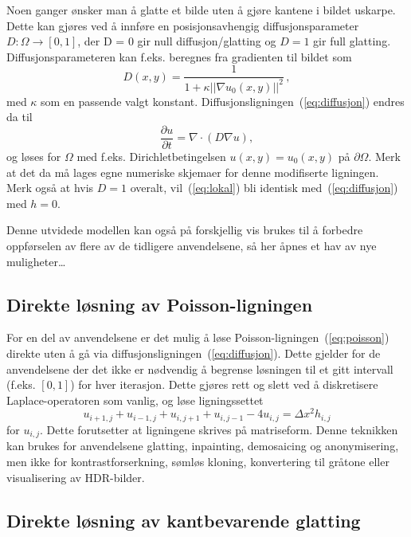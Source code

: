 \documentclass[11pt,a4paper]{article}
\begin{document}
Noen ganger ønsker man å glatte et bilde uten å gjøre kantene i bildet uskarpe. Dette kan gjøres ved å innføre en posisjonsavhengig diffusjonsparameter $D : \Omega \to [0, 1]$, der D = 0 gir null diffusjon/glatting og $D = 1$ gir full glatting. Diffusjonsparameteren kan f.eks. beregnes fra gradienten til bildet som
\begin{equation}
  D(x, y) = \frac{1}{1 + \kappa ||\nabla u_0(x, y)||^2}\,,
  \label{eq:diffparam}
\end{equation}
med $\kappa$ som en passende valgt konstant.
Diffusjonsligningen~(\ref{eq:diffusjon}) endres da til
\begin{equation}
  \label{eq:lokal}
  \frac{\partial u}{\partial t} = \nabla\cdot(D\nabla u),
\end{equation}
og løses for $\Omega$ med f.eks. Dirichletbetingelsen $u(x, y) = u_0(x, y)$ på $\partial\Omega$. Merk at det da må lages egne numeriske skjemaer for denne modifiserte ligningen. Merk også at hvis $D=1$ overalt, vil~(\ref{eq:lokal}) bli identisk med~(\ref{eq:diffusjon}) med $h=0$.

Denne utvidede modellen kan også på forskjellig vis brukes til å forbedre oppførselen av flere av de tidligere anvendelsene, så her åpnes et hav av nye muligheter\dots

\subsection{Direkte løsning av Poisson-ligningen}
\label{sec:poisson}

For en del av anvendelsene er det mulig å løse Poisson-ligningen~(\ref{eq:poisson}) direkte uten å gå via diffusjonsligningen~(\ref{eq:diffusjon}). Dette gjelder for de anvendelsene der det ikke er nødvendig å begrense løsningen til et gitt intervall (f.eks. $[0, 1]$) for hver iterasjon. Dette gjøres rett og slett ved å diskretisere Laplace-operatoren som vanlig, og løse ligningssettet
$$
u_{i+1,j} +
u_{i-1,j} +
u_{i,j+1} +
u_{i,j-1} -
4 u_{i,j} = \Delta x^2 h_{i,j}
$$
for $u_{i,j}$. Dette forutsetter at ligningene skrives på matriseform. Denne teknikken kan brukes for anvendelsene glatting, inpainting, demosaicing og anonymisering, men ikke for kontrastforserkning, sømløs kloning, konvertering til gråtone eller visualisering av HDR-bilder.

\subsection{Direkte løsning av kantbevarende glatting}
\label{sec:direktekant}
\end{document}
